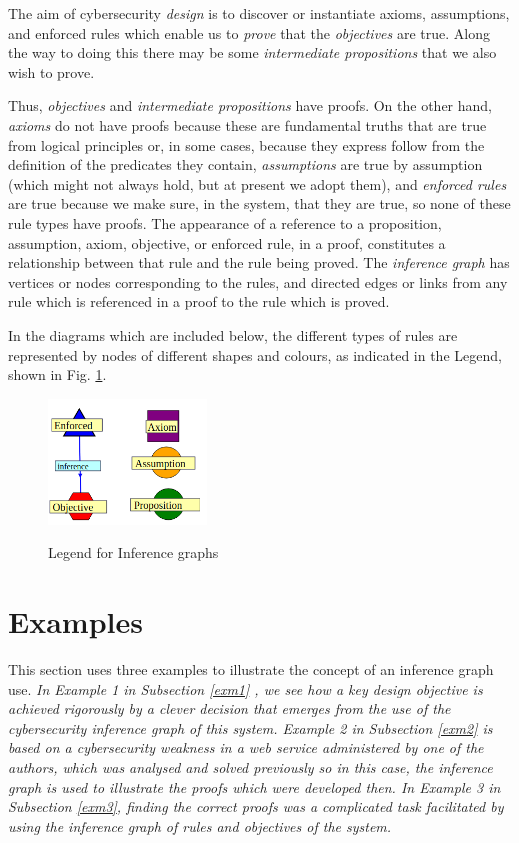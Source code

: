 The aim of cybersecurity {\em design} is to discover or instantiate axioms,
assumptions, and enforced rules which enable us to {\em prove} that
the {\em objectives} are true. Along the way to doing this there may
be some {\em intermediate propositions} that we also wish to prove.

Thus, {\em objectives} and {\em intermediate propositions} have proofs.
On the other hand, {\em axioms} do not have proofs because these are
fundamental truths that are true from logical principles
or, in some cases, because they express follow from the definition 
of the predicates they contain, {\em assumptions}
are true by assumption (which might not always hold, but at present
we adopt them), and {\em enforced rules} are true because we make sure,
in the system, that they are true, so none of these rule types
have proofs.
The appearance of a reference to a
proposition, assumption, axiom, objective, or enforced
rule, in a proof,  constitutes a relationship between that rule
and the rule being proved. The {\em inference graph} has vertices or
nodes corresponding to the rules, and directed edges or links from any
rule which is referenced in a proof to the rule which is proved.


In the diagrams which are included below, the different types of rules
are represented by nodes of different shapes and colours, as 
indicated in the Legend, shown in Fig. \ref{legend}.
\begin{figure}[bhpt]
	\centering
		\leavevmode\includegraphics[width=42mm]{figures/legend.png}\ \\
		\caption{Legend for Inference graphs}\label{legend}
\end{figure}

\section{Examples}\label{examplesec}
This section uses three examples to illustrate the concept of an inference graph use. {\em In Example 1 in Subsection \ref{exm1} , we see how a key design objective is achieved rigorously by a clever decision that emerges from the use of the cybersecurity inference graph of this system. Example 2 in Subsection \ref{exm2} is based on a cybersecurity weakness in a web service administered by one of the authors, which was analysed and solved previously \cite{exptsandproofs} so in this case, the inference graph is used to illustrate the proofs which were developed then. In Example 3 in Subsection \ref{exm3}, finding the correct proofs was a complicated task facilitated by using the inference graph of rules and objectives of the system.}

